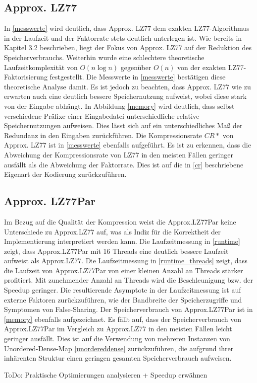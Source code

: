 \subsection{Approx. LZ77}
In \ref{messwerte} wird deutlich, dass Approx. LZ77 dem exakten LZ77-Algorithmus in der Laufzeit und der Faktorrate stets deutlich unterlegen ist. Wie bereits in Kapitel
3.2 beschrieben, liegt der Fokus von Approx. LZ77 auf der Reduktion des Speicherverbrauchs. Weiterhin wurde eine schlechtere theoretische Laufzeitkomplexität von
$O(n\log n)$ gegenüber $O(n)$ von der exakten LZ77-Faktorisierung festgestellt. Die Messwerte in \ref{messwerte} bestätigen diese theoretische Analyse damit. Es ist 
jedoch zu beachten, dass Approx. LZ77 wie zu erwarten auch eine deutlich bessere Speichernutzung aufweist, wobei diese stark von der Eingabe abhängt. In Abbildung 
\ref{memory} wird deutlich, dass selbst verschiedene Präfixe einer Eingabedatei unterschiedliche relative Speichernutzungen aufweisen. Dies lässt sich auf ein 
unterschiedliches Maß der Redundanz in den Eingaben zurückführen. Die Kompressionsrate $CR*$ von Approx. LZ77 ist in \ref{messwerte} ebenfalls aufgeführt. Es ist 
zu erkennen, dass die Abweichung der Kompressionsrate von LZ77 in den meisten Fällen geringer ausfällt als die Abweichung der Faktorrate. Dies ist auf die in 
\ref{cr} beschriebene Eigenart der Kodierung zurückzuführen.

\subsection{Approx. LZ77Par}
Im Bezug auf die Qualität der Kompression weist die Approx.LZ77Par keine Unterschiede zu Approx.LZ77 auf, was als Indiz für die Korrektheit der Implementierung
interpretiert werden kann. Die Laufzeitmessung in \ref{runtime} zeigt, dass Approx.LZ77Par mit 16 Threads eine deutlich bessere Laufzeit aufweist als Approx.LZ77.
Die Laufzeitmessung in \ref{runtime_threads} zeigt, dass die Laufzeit von Approx.LZ77Par von einer kleinen Anzahl an Threads stärker profitiert. Mit zunehmender 
Anzahl an Threads wird die Beschleunigung bzw. der Speedup geringer. Die resultierende Asymptote in der Laufzeitmessung ist auf externe Faktoren zurückzuführen,
wie der Bandbreite der Speicherzugriffe und Symptomen von False-Sharing. Der Speicherverbrauch von Approx.LZ77Par ist in \ref{memory} ebenfalls aufgezeichnet.
Es fällt auf, dass der Speicherverbrauch von Approx.LZ77Par im Vergleich zu Approx.LZ77 in den meisten Fällen leicht geringer ausfällt. 
Dies ist auf die Verwendung von mehreren Instanzen von Unordered-Dense-Map \ref{unordereddense} zurückzuführen, die aufgrund ihrer inhärenten Struktur einen 
geringen gesamten Speicherverbrauch aufweisen.

ToDo: Praktische Optimierungen analysieren + Speedup erwähnen